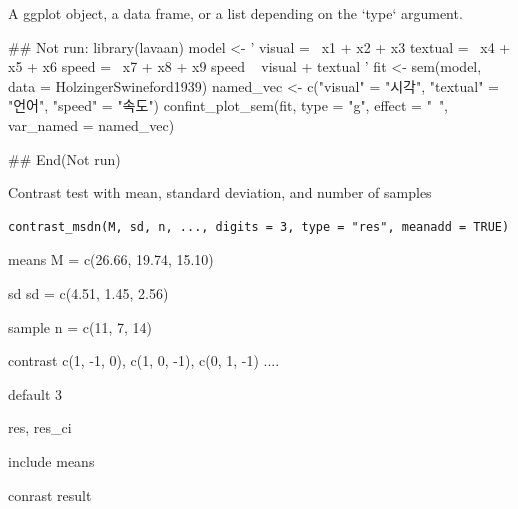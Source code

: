\documentclass[a4paper]{book}
\begin{document}
%
\begin{Value}
A ggplot object, a data frame, or a list depending on the `type` argument.
\end{Value}
%
\begin{Examples}
\begin{ExampleCode}
\#\# Not run: 
library(lavaan)
model <- '
  visual  =~ x1 + x2 + x3
  textual =~ x4 + x5 + x6
  speed   =~ x7 + x8 + x9
  speed ~ visual + textual
'
fit <- sem(model, data = HolzingerSwineford1939)
named_vec <- c("visual" = "시각", "textual" = "언어", "speed" = "속도")
confint_plot_sem(fit, type = "g", effect = "~", var_named = named_vec)

## End(Not run)
\end{ExampleCode}
\end{Examples}
%
\begin{Description}
Contrast test with mean, standard deviation, and number of samples
\end{Description}
%
\begin{Usage}
\begin{verbatim}
contrast_msdn(M, sd, n, ..., digits = 3, type = "res", meanadd = TRUE)
\end{verbatim}
\end{Usage}
%
\begin{Arguments}
\begin{ldescription}
\item[\code{M}] means M = c(26.66, 19.74, 15.10)

\item[\code{sd}] sd  sd = c(4.51, 1.45, 2.56)

\item[\code{n}] sample  n = c(11, 7, 14)

\item[\code{...}] contrast c(1, -1,  0), c(1,  0, -1), c(0,  1, -1) ....

\item[\code{digits}] default 3

\item[\code{type}] res, res\_ci

\item[\code{meanadd}] include means
\end{ldescription}
\end{Arguments}
%
\begin{Value}
conrast result
\end{Value}
\end{document}
